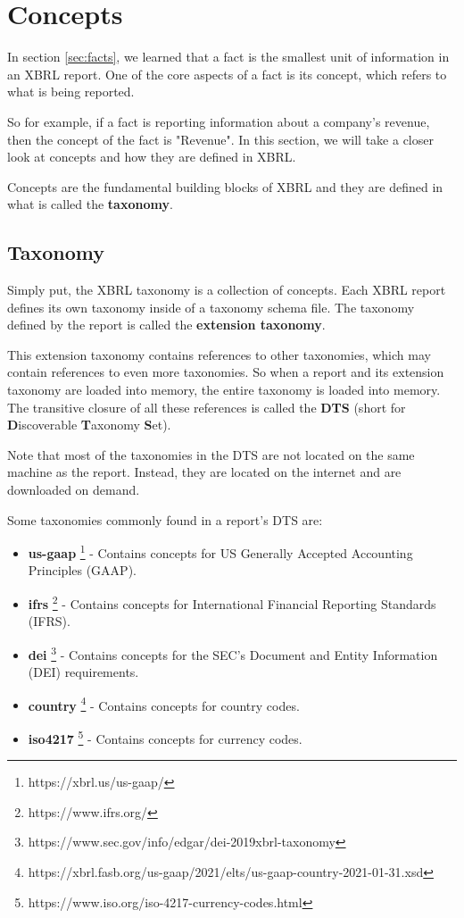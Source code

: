 \section{Concepts}
\label{sec:concepts}

In section \ref{sec:facts}, we learned that a fact is the smallest unit of information in an XBRL report. 
One of the core aspects of a fact is its concept,
which refers to what is being reported.

So for example, if a fact is reporting information about a company's revenue, then the concept of the fact is "Revenue".
In this section, we will take a closer look at concepts and how they are defined in XBRL.

Concepts are the fundamental building blocks of XBRL and they are defined in what is called the \textbf{taxonomy}.

\subsection{Taxonomy}

Simply put, the XBRL taxonomy is a collection of concepts. 
Each XBRL report defines its own taxonomy inside of a taxonomy schema file. 
The taxonomy defined by the report is called the \textbf{extension taxonomy}.

This extension taxonomy contains references to other taxonomies, which may contain references to even more taxonomies.
So when a report and its extension taxonomy are loaded into memory, the entire taxonomy is loaded into memory.
The transitive closure of all these references is called the \textbf{DTS} (short for \textbf{D}iscoverable \textbf{T}axonomy \textbf{S}et).

Note that most of the taxonomies in the DTS are not located on the same machine as the report.
Instead, they are located on the internet and are downloaded on demand.

Some taxonomies commonly found in a report's DTS are:

\begin{itemize}
    \item \textbf{us-gaap} \footnote{https://xbrl.us/us-gaap/} - Contains concepts for US Generally Accepted Accounting Principles (GAAP).
    \item \textbf{ifrs} \footnote{https://www.ifrs.org/} - Contains concepts for International Financial Reporting Standards (IFRS).
    \item \textbf{dei} \footnote{https://www.sec.gov/info/edgar/dei-2019xbrl-taxonomy} - Contains concepts for the SEC's Document and Entity Information (DEI) requirements.
    \item \textbf{country} \footnote{https://xbrl.fasb.org/us-gaap/2021/elts/us-gaap-country-2021-01-31.xsd} - Contains concepts for country codes.
    \item \textbf{iso4217} \footnote{https://www.iso.org/iso-4217-currency-codes.html} - Contains concepts for currency codes.
\end{itemize}

